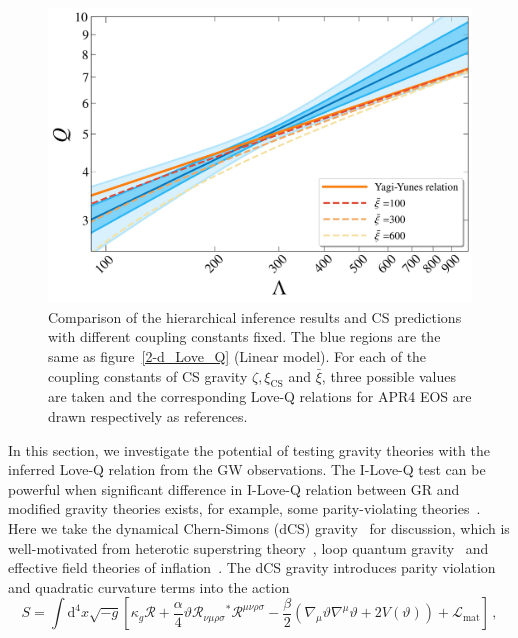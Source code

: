 \documentclass[a4paper,11pt]{article}
\begin{document}
\begin{figure}[htbp]
\begin{minipage}{0.48\linewidth}
    \end{minipage}
    \vspace{3mm}
    \begin{minipage}{0.48\linewidth}
        \includegraphics[width=\linewidth]{CS_xi_bar_APR4_2d.pdf}
    \end{minipage}
    \caption{Comparison of the hierarchical inference results and CS predictions with different coupling constants fixed. The blue regions are the same as figure~\ref{2-d_Love_Q} (Linear model). For each of the coupling constants of CS gravity $\zeta, \xi_{\mathrm{CS}}$ and $\bar\xi$, three possible values are taken and the corresponding Love-Q relations for APR4 EOS are drawn respectively as references.}
    \label{cs_Love_Q}
\end{figure}
In this section, we investigate the potential of testing gravity theories with the inferred Love-Q relation from the GW observations. The I-Love-Q test can be powerful when significant difference in I-Love-Q relation between GR and modified gravity theories exists, for example, some parity-violating theories~\cite{Yagi_2017, Yunes:2025xwp}. Here we take the dynamical Chern-Simons (dCS) gravity~\cite{Jackiw:2003pm, Smith:2007jm,Alexander:2009tp} for discussion, which is well-motivated from heterotic superstring theory~\cite{Polchinski:1998rq,Polchinski:1998rr}, loop quantum gravity~\cite{Alexander:2004xd,Taveras:2008yf,Calcagni:2009xz} and effective field theories of inflation~\cite{Weinberg:2008hq}. The dCS gravity introduces parity violation and quadratic curvature terms into the action~\cite{Alexander:2009tp,Gupta:2017vsl}
\begin{equation}
   \label{cs_action}
   S = \int \mathrm{d}^4 x \sqrt{-g}\left[ \kappa_g \mathcal{R} + \frac{\alpha}{4} \mathcal{\vartheta} \mathcal{R}_{\nu\mu\rho\sigma} {}^{*}\mathcal{R}^{\mu\nu\rho\sigma} - \frac{\beta}{2}\left(\nabla_{\mu}\mathcal{\vartheta}\nabla^{\mu}\mathcal{\vartheta}+2V(\mathcal{\vartheta})\right) + \mathcal{L}_{\mathrm{mat}}\right]\,,
\end{equation}
\end{document}
